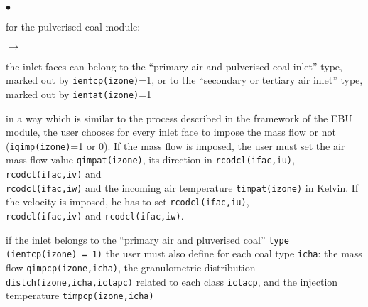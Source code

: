 {{{\begin{list}{$\bullet$}{}
       \item for the pulverised coal module:
             \begin{list}{$\rightarrow$}{}
                    \item the inlet faces can belong to the ``primary
                          air and pulverised coal inlet'' type, marked
                          out by \texttt{ientcp(izone)}=1, or to
                          the ``secondary or tertiary air inlet'' type,
                          marked out by \texttt{ientat(izone)}=1
                    \item in a way which is similar to the process
                          described in the framework of the EBU module,
                          the user chooses for every inlet face to
                          impose the mass flow or not (\texttt{iqimp(izone)}=1 or
                          0). If the mass flow is imposed, the user
                          must set the air mass flow value
                          \texttt{qimpat(izone)}, its direction in
                          \texttt{rcodcl(ifac,iu)}, \texttt{rcodcl(ifac,iv)}
                          and \\ \texttt{rcodcl(ifac,iw)} and the incoming
                          air temperature \texttt{timpat(izone)} in
                          Kelvin. If the velocity is imposed, he has to
                          set  \texttt{rcodcl(ifac,iu)}, \\
                          \texttt{rcodcl(ifac,iv)} and \texttt{rcodcl(ifac,iw)}.

                    \item if the inlet belongs to the ``primary air and
                          pluverised coal'' \texttt{type (ientcp(izone) = 1)} the
                          user must also define for each coal type \texttt{icha}:
                          the mass flow
                          \texttt{qimpcp(izone,icha)}, the
                          granulometric distribution
                          \texttt{distch(izone,icha,iclapc)}
                          related to each class \texttt{iclacp}, and the
                          injection temperature
                          \texttt{timpcp(izone,icha)}

             \end{list}
\end{list}

}}}
